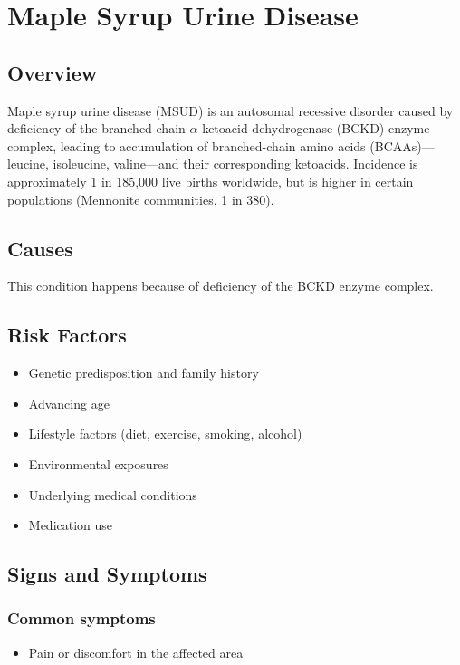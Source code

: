 \chapter{Maple Syrup Urine Disease}
\label{sec:Maple Syrup Urine Disease}

\section{Overview}
Maple syrup urine disease (MSUD) is an autosomal recessive disorder caused by deficiency of the branched-chain $\alpha$-ketoacid dehydrogenase (BCKD) enzyme complex, leading to accumulation of branched-chain amino acids (BCAAs)---leucine, isoleucine, valine---and their corresponding ketoacids. Incidence is approximately 1 in 185,000 live births worldwide, but is higher in certain populations (Mennonite communities, 1 in 380).
\section{Causes}
This condition happens because of deficiency of the BCKD enzyme complex.     
\section{Risk Factors}

\begin{itemize}[noitemsep]
  \item Genetic predisposition and family history
  \item Advancing age
  \item Lifestyle factors (diet, exercise, smoking, alcohol)
  \item Environmental exposures
  \item Underlying medical conditions
  \item Medication use
\end{itemize}
\section{Signs and Symptoms}

\subsection{Common symptoms}
\begin{itemize}[noitemsep]
  \item Pain or discomfort in the affected area
  \end{itemize}

